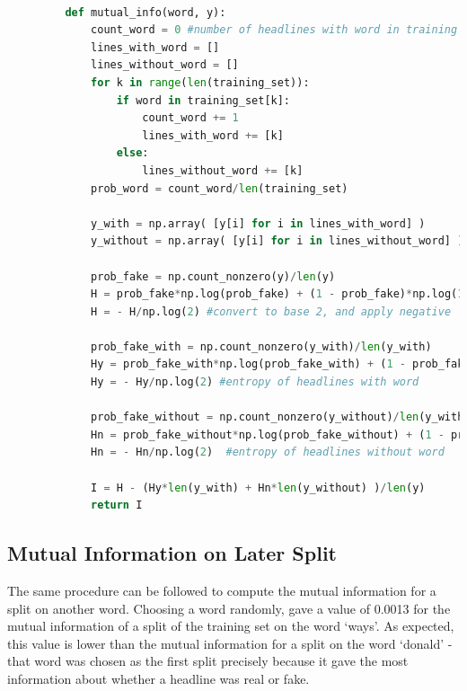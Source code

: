 \documentclass{article}
\begin{document}
      \begin{lstlisting}[language=Python]

         def mutual_info(word, y):
             count_word = 0 #number of headlines with word in training set
             lines_with_word = []
             lines_without_word = []
             for k in range(len(training_set)):
                 if word in training_set[k]:
                     count_word += 1
                     lines_with_word += [k]
                 else:
                     lines_without_word += [k]
             prob_word = count_word/len(training_set)

             y_with = np.array( [y[i] for i in lines_with_word] )
             y_without = np.array( [y[i] for i in lines_without_word] )

             prob_fake = np.count_nonzero(y)/len(y)
             H = prob_fake*np.log(prob_fake) + (1 - prob_fake)*np.log(1 - prob_fake) #entropy before split
             H = - H/np.log(2) #convert to base 2, and apply negative

             prob_fake_with = np.count_nonzero(y_with)/len(y_with)
             Hy = prob_fake_with*np.log(prob_fake_with) + (1 - prob_fake_with)*np.log(1 - prob_fake_with)
             Hy = - Hy/np.log(2) #entropy of headlines with word

             prob_fake_without = np.count_nonzero(y_without)/len(y_without)
             Hn = prob_fake_without*np.log(prob_fake_without) + (1 - prob_fake_without)*np.log(1 - prob_fake_without)
             Hn = - Hn/np.log(2)  #entropy of headlines without word

             I = H - (Hy*len(y_with) + Hn*len(y_without) )/len(y)
             return I
      \end{lstlisting}



   \subsection{Mutual Information on Later Split}
   The same procedure can be followed to compute the mutual information for a split on another word.
   Choosing a word randomly, gave a value of 0.0013 for the mutual information of a split of the training
   set on the word `ways'. As expected, this value is lower than the mutual information for a split on the
   word `donald' - that word was chosen as the first split precisely because it gave the most information
   about whether a headline was real or fake.
\end{document}

